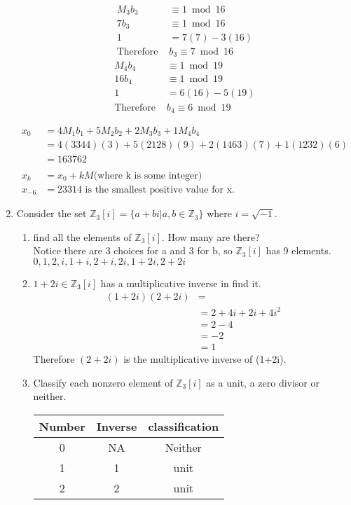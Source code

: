 \documentclass{article}
\newcommand{\Z}{\mathbb{Z}}
\begin{document}
\begin{enumerate}
\begin{multicols}{2}
			\begin{align*}
				M_3b_3 &\equiv1 \bmod{16}\\
				7b_3 &\equiv1 \bmod{16}\\
				1  &= 7(7)-3(16)\\
				\text{Therefore } & b_3\equiv 7 \bmod{16}
			\end{align*}
			\begin{align*}
				M_4b_4 &\equiv1 \bmod{19}\\
				16b_4 &\equiv1 \bmod{19}\\
				1  &= 6(16)-5(19)\\
				\text{Therefore } & b_4\equiv 6 \bmod{19}
			\end{align*}
		\end{multicols}
			\begin{align*}
				x_0  &= 4M_1b_1 + 5M_2b_2+ 2M_3b_3 + 1M_4b_4\\
				     &= 4(3344)(3)+5(2128)(9)+ 2(1463)(7)+1(1232)(6)\\
				     &= 163762\\
				     \\
				x_k  &= x_0 + kM  \text{(where k is some integer)}\\
				x_{-6}  &= 23314 \text{ is the smallest positive value for x.}				
			\end{align*}
		
		
		\item Consider the set $\Z_3[i] = \{ a+bi |a,b \in \Z_3 \}$ where $i = \sqrt{-1}$.
		\begin{enumerate}
			\item find all the elements of $\Z_3[i]$. How many are there?\\
			Notice there are 3 choices for a and 3 for b, so $\Z_3[i]$ has 9 elements.\\ 
			$0, 1 , 2, 
			i, 1+i, 2+i, 
			2i, 1+2i, 2+2i $
			
			\item $1+2i \in \Z_3[i] $ has a multiplicative inverse in find it.
			 \begin{align*}
			 	(1+2i)(2+2i) &=\\
			 		&= 2+4i+2i +4i^2 \\
			 		&= 2-4 \\
			 		&= -2 \\
			 		&= 1
			 \end{align*}
			 Therefore $(2+2i)$ is the multiplicative inverse of  (1+2i).
			 
			\item Classify each nonzero element of $\Z_3[i]$ as a unit, a zero divisor or 
			neither. 
			\begin{table}[htbp]
				\centering
				\begin{tabular}{|c|c|c|}
					\hline
					Number & Inverse & classification\\
					\hline
					\hline
					0 & NA & Neither \\
					\hline
					1 & 1 & unit \\
					\hline
					2 & 2 & unit\\
					\hline
					

\end{tabular}
\end{table}
\end{enumerate}
\end{enumerate}
\end{document}

